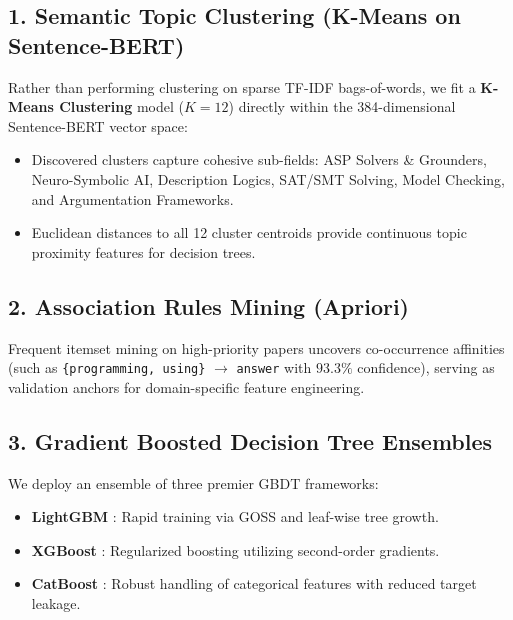 \subsection{1. Semantic Topic Clustering (K-Means on Sentence-BERT)}
Rather than performing clustering on sparse TF-IDF bags-of-words, we fit a \textbf{K-Means Clustering} model ($K = 12$) directly within the 384-dimensional Sentence-BERT vector space:
\begin{itemize}
  \item Discovered clusters capture cohesive sub-fields: ASP Solvers \& Grounders, Neuro-Symbolic AI, Description Logics, SAT/SMT Solving, Model Checking, and Argumentation Frameworks.
  \item Euclidean distances to all 12 cluster centroids provide continuous topic proximity features for decision trees.
\end{itemize}

\subsection{2. Association Rules Mining (Apriori)}
Frequent itemset mining on high-priority papers uncovers co-occurrence affinities (such as \texttt{\{programming, using\}} $\to$ \texttt{answer} with $93.3\%$ confidence), serving as validation anchors for domain-specific feature engineering.

\subsection{3. Gradient Boosted Decision Tree Ensembles}
We deploy an ensemble of three premier GBDT frameworks:
\begin{itemize}
  \item \textbf{LightGBM} \cite{ke2017lightgbm}: Rapid training via GOSS and leaf-wise tree growth.
  \item \textbf{XGBoost} \cite{chen2016xgboost}: Regularized boosting utilizing second-order gradients.
  \item \textbf{CatBoost} \cite{prokhorenkova2018catboost}: Robust handling of categorical features with reduced target leakage.
\end{itemize}

